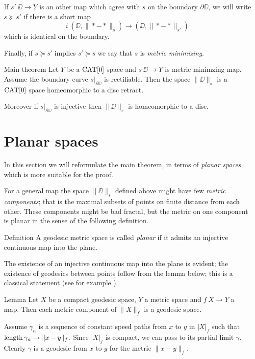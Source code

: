 \documentclass{article}
\begin{document}
If $s'\:\DD\to Y$ is an other map which agree with $s$ on the boundary $\partial \DD$,
we will write $s\succcurlyeq s'$ if there is a short map 
\[i\:(\DD,\|{*}-{*}\|_s)\to (\DD,\|{*}-{*}\|_{s'})\] 
which is identical on the boundary. 

Finally, if $s\succcurlyeq s'$ implies $s'\succcurlyeq s$ we say that $s$ is \emph{metric minimizing}.

\begin{thm}{Main theorem}\label{thm:mainintro}
Let $Y$ be a $\mathop{\rm CAT}\nolimits[0]$ space and $s\:\DD\to Y$ is metric minimzing map.
Assume the boundary curve $s|_{\partial\DD}$ is rectifiable.
Then the space $\|\DD\|_s$ is a $\mathop{\rm CAT}\nolimits[0]$ space homeomorphic to a disc retract.

Moreover if $s|_{\partial\DD}$ is injective then $\|\DD\|_s$ is homeomorphic to a disc.
\end{thm}

\section{Planar spaces}

In this section we will reformulate the main theorem, in terms of \emph{planar spaces} which is more suitable for the proof.  

For a general map the space $\|\DD\|_s$ defined above might have few \emph{metric components};
that is the maximal subsets of points on finite distance from each other.
These components might be bad fractal, 
but the metric on one component is planar in the sense of the following definition.

\begin{thm}{Definition}
A geodesic metric space is called \emph{planar} if it admits an injective continuous map into the plane.
\end{thm}

The existence of an injective continuous map into the plane is evident;
the existence of geodesics between points follow  from the lemma below;
this is a classical statement (see for example \cite[II-\S8 Thm. 3]{KF}).


\begin{thm}{Lemma}\label{lem:geospace}
Let $X$ be a compact geodesic space, $Y$ a metric space and $f\:X\to Y$ a map. 
Then each metric component of $\|X\|_f$ is a geodesic space.
\end{thm}

Assume $\gamma_n$ is a sequence of constant speed paths from $x$ to $y$ in $|X|_f$
such that $\mathop{\rm length}\nolimits\gamma_n\to \|x-y\|_f$.
Since $|X|_f$ is compact, we can pass to its partial limit $\gamma$.
Clearly $\gamma$ is a geodesic from $x$ to $y$ for the metric $\|x-y\|_f$.
\qeds
\end{document}
